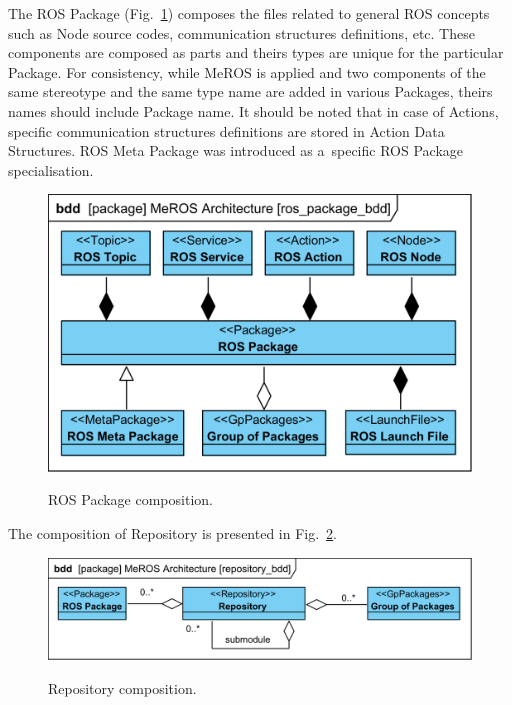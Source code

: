 \documentclass[11pt,oneside,a4paper]{report}
\begin{document}
	The ROS Package (Fig.~\ref{fig:ros_package_bdd}) composes the files related to general ROS concepts such as Node source codes, communication structures definitions, etc. These components are composed as parts and theirs types are unique for the particular Package. For consistency, while MeROS is applied and two components of the same stereotype and the same type name are added in various Packages, theirs names should include Package name.  It should be noted that in case of Actions, specific communication structures definitions are stored in Action Data Structures. ROS Meta Package was introduced as a~specific ROS Package specialisation.
	
	\begin{figure}[H]
		\centering
		\begin{center}
			{\includegraphics[scale=1.0]{diagrams/ros_package_bdd.png}}
		\end{center}
		\caption{ROS Package composition.} 
		\label{fig:ros_package_bdd}
	\end{figure}
		
The composition of Repository is presented in Fig.~\ref{fig:repository_bdd}.	
	
	\begin{figure}[H]
		\centering
		\begin{center}
			{\includegraphics[scale=1.0]{diagrams/repository_bdd.png}}
		\end{center}
		\caption{Repository composition.} 
		\label{fig:repository_bdd}
	\end{figure}
\end{document}

